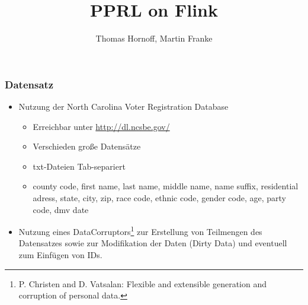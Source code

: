 \documentclass{beamer}
\title{PPRL on Flink}
\author{Thomas Hornoff, Martin Franke}
\begin{document}
	
	\maketitle	

	\begin{frame}
		\frametitle{Datensatz}
		
		\begin{itemize}
			\item Nutzung der North Carolina Voter Registration Database
				\begin{itemize}
					\item Erreichbar unter \url{http://dl.ncsbe.gov/}
					\item Verschieden große Datensätze
					\item txt-Dateien Tab-separiert
					\item county code, first name, last name, middle name, name suffix, residential
					 adress, state, city, zip, race code, ethnic code, gender code, age, party code,
					 dmv date 
				\end{itemize}
			
			\item Nutzung eines DataCorruptors\footnote{P. Christen and D. Vatsalan: Flexible
			 and extensible generation and corruption of personal data.} zur Erstellung von
			 Teilmengen des Datensatzes sowie zur Modifikation der Daten (Dirty Data) und 
			 eventuell zum Einfügen von IDs.
		\end{itemize}	
	
	\end{frame}
\end{document}

